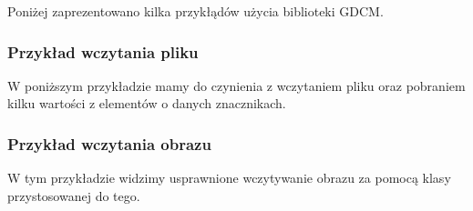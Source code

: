 Poniżej zaprezentowano kilka przykłądów użycia biblioteki GDCM.

\newpage
\subsubsection{Przykład wczytania pliku}

W poniższym przykładzie mamy do czynienia z wczytaniem pliku oraz pobraniem kilku wartości z elementów o danych znacznikach.




\newpage
\subsubsection{Przykład wczytania obrazu}

W tym przykładzie widzimy usprawnione wczytywanie obrazu za pomocą klasy przystosowanej do tego.


